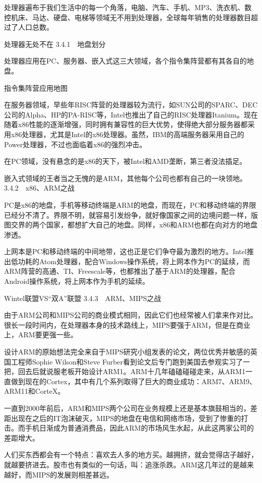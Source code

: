 \documentclass[12pt,UTF8]{ctexbook}
\begin{document}
处理器遍布于我们生活中的每一个角落，电脑、汽车、手机、MP3、洗衣机、数控机床、马达、硬盘、电梯等领域无不用到处理器，全球每年销售的处理器数目超过了人口总数。

处理器无处不在
3.4.1　地盘划分

处理器应用在PC、服务器、嵌入式这三大领域，各个指令集阵营都有其各自的地盘。

指令集阵营应用地图

在服务器领域，早些年RISC阵营的处理器较为流行，如SUN公司的SPARC、DEC公司的Alpha、HP的PA-RISC等，Intel也推出了自己的RISC处理器Itanium。现在随着x86性能的逐渐增强，同时拥有兼容性的巨大优势，使得绝大部分服务器都采用x86处理器，尤其是Intel的x86处理器。虽然，IBM的高端服务器采用自己的Power处理器，不过也面临着x86的强烈冲击。

在PC领域，没有悬念的是x86的天下，被Intel和AMD垄断，第三者没法插足。

嵌入式领域的王者当之无愧的是ARM，其他每个公司也都有自己的一块领地。
3.4.2　x86、ARM之战

PC是x86的地盘，手机等移动终端是ARM的地盘，而现在，PC和移动终端的界限已经分不清了。界限不明，就容易引发纷争，就好像国家之间的边境问题一样，版图交界的两个国家，都想扩大自己的地盘。同样，x86和ARM也都在向对方的地盘渗透。

上网本是PC和移动终端的中间地带，这也正是它们争夺最为激烈的地方。Intel推出低功耗的Atom处理器，配合Windows操作系统，将上网本作为PC的延续，而ARM阵营的高通、TI、Freescale等，也都推出了基于ARM的处理器，配合Android操作系统，将上网本作为手机的延续。

Wintel联盟VS“双A”联盟
3.4.3　ARM、MIPS之战

由于ARM公司和MIPS公司的商业模式相同，因此它们也经常被人们拿来作对比。很长一段时间内，在处理器本身的技术路线上，MIPS要强于ARM，但是在商业上，ARM要更强一些。

设计ARM的原始想法完全来自于MIPS研究小组发表的论文，两位优秀并敏感的英国工程师Sophie Wilson和Steve Furber看到论文后专门跑到美国去参观实习了一把，回去后就说服老板开始设计ARM1。ARM十几年磕磕碰碰走来，从ARM1一直做到现在的Cortex，其中有几个系列取得了巨大的商业成功：ARM7、ARM9、ARM11和CorteX。

一直到2000年前后，ARM和MIPS两个公司在业务规模上还是基本旗鼓相当的，差距出现在之后的IT泡沫破灭，MIPS的地盘在电信和网络市场，受到了惨重的打击。而手机日渐成为普通消费品，因此ARM的市场风生水起，从此这两家公司的差距增大。

人们买东西都会有一个特点：喜欢去人多的地方买。越拥挤，就会觉得店子越好，就越要挤进去。股市也有类似的一句话，叫：追涨杀跌。ARM这几年过的是越来越好，而MIPS的发展则相差甚远。
\end{document}
